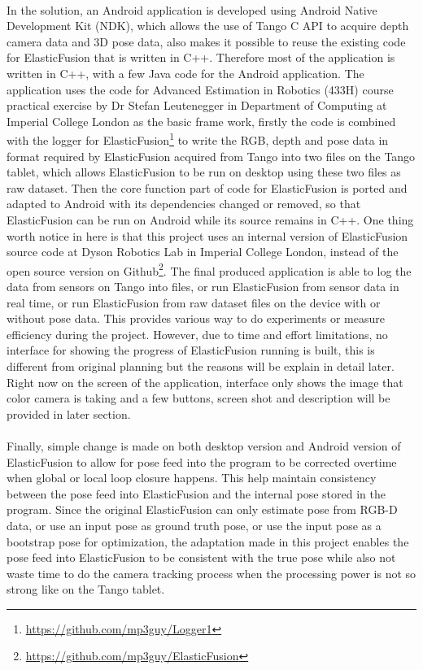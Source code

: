 \documentclass[12pt,twoside]{article}
\begin{document}
\\
In the solution, an Android application is developed using Android Native Development Kit (NDK), which allows the use of Tango C API to acquire depth camera data and 3D pose data, also makes it possible to reuse the existing code for ElasticFusion that is written in C++. Therefore most of the application is written in C++, with a few Java code for the Android application. The application uses the code for Advanced Estimation in Robotics (433H) course practical exercise by Dr Stefan Leutenegger in Department of Computing at Imperial College London as the basic frame work, firstly the code is combined with the logger for ElasticFusion\footnote{\url{https://github.com/mp3guy/Logger1}} to write the RGB, depth and pose data in format required by ElasticFusion acquired from Tango into two files on the Tango tablet, which allows ElasticFusion to be run on desktop using these two files as raw dataset. Then the core function part of code for ElasticFusion is ported and adapted to Android with its dependencies changed or removed, so that ElasticFusion can be run on Android while its source remains in C++. One thing worth notice in here is that this project uses an internal version of ElasticFusion source code at Dyson Robotics Lab in Imperial College London, instead of the open source version on Github\footnote{\url{https://github.com/mp3guy/ElasticFusion}}. The final produced application is able to log the data from sensors on Tango into files, or run ElasticFusion from sensor data in real time, or run ElasticFusion from raw dataset files on the device with or without pose data. This provides various way to do experiments or measure  efficiency during the project. However, due to time and effort limitations, no interface for showing the progress of ElasticFusion running is built, this is different from original planning but the reasons will be explain in detail later. Right now on the screen of the application, interface only shows the image that color camera is taking and a few buttons, screen shot and description will be provided in later section.\\
\\
Finally, simple change is made on both desktop version and Android version of ElasticFusion to allow for pose feed into the program to be corrected overtime when global or local loop closure happens. This help maintain consistency between the pose feed into ElasticFusion and the internal pose stored in the program. Since the original ElasticFusion can only estimate pose from RGB-D data, or use an input pose as ground truth pose, or use the input pose as a bootstrap pose for optimization, the adaptation made in this project enables the pose feed into ElasticFusion to be consistent with the true pose while also not waste time to do the camera tracking process when the processing power is not so strong like on the Tango tablet.
\end{document}
